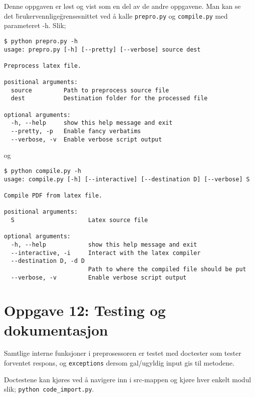 \documentclass{article}
\begin{document}
Denne oppgaven er løst og vist som en del av de andre oppgavene. Man kan se det \"brukervennlige\" grensesnittet ved å kalle \verb;prepro.py; og \verb;compile.py; med parameteret -h. Slik;

\begin{Verbatim}[numbers=none,frame=lines,label=\fbox{{\tiny Terminal}},fontsize=\fontsize{9pt}{9pt},labelposition=topline,framesep=2.5mm,framerule=0.7pt]
$ python prepro.py -h
usage: prepro.py [-h] [--pretty] [--verbose] source dest

Preprocess latex file.

positional arguments:
  source         Path to preprocess source file
  dest           Destination folder for the processed file

optional arguments:
  -h, --help     show this help message and exit
  --pretty, -p   Enable fancy verbatims
  --verbose, -v  Enable verbose script output
\end{Verbatim}
\noindent


og

\begin{Verbatim}[numbers=none,frame=lines,label=\fbox{{\tiny Terminal}},fontsize=\fontsize{9pt}{9pt},labelposition=topline,framesep=2.5mm,framerule=0.7pt]
$ python compile.py -h
usage: compile.py [-h] [--interactive] [--destination D] [--verbose] S

Compile PDF from latex file.

positional arguments:
  S                     Latex source file

optional arguments:
  -h, --help            show this help message and exit
  --interactive, -i     Interact with the latex compiler
  --destination D, -d D
                        Path to where the compiled file should be put
  --verbose, -v         Enable verbose script output
\end{Verbatim}
\noindent




\section*{Oppgave 12: Testing og dokumentasjon}

Samtlige interne funksjoner i preprosessoren er testet med doctester som tester forventet respons, og \verb;exceptions; dersom gal/ugyldig input gis til metodene.

Doctestene kan kjøres ved å navigere inn i src-mappen og kjøre hver enkelt modul slik; \verb;python code_import.py;.
\end{document}
